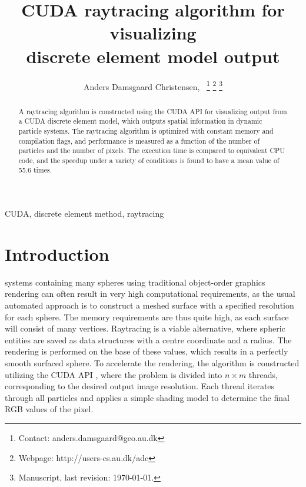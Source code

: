 \documentclass[journal]{IEEEtran}
\begin{document}
\title{CUDA raytracing algorithm for visualizing\\ discrete element model output}

\author{Anders Damsgaard Christensen,~
\thanks{Contact: {anders.damsgaard@geo.au.dk}}%
\thanks{Webpage: {http://users-cs.au.dk/adc}}%
\thanks{Manuscript, last revision: \today.}}


\maketitle


\begin{abstract}
A raytracing algorithm is constructed using the CUDA API for visualizing output from a CUDA discrete element model, which outputs spatial information in dynamic particle systems. 
The raytracing algorithm is optimized with constant memory and compilation flags, and performance is measured as a function of the number of particles and the number of pixels. The execution time is compared to equivalent CPU code, and the speedup under a variety of conditions is found to have a mean value of 55.6 times.
\end{abstract}
\begin{IEEEkeywords}
CUDA, discrete element method, raytracing
\end{IEEEkeywords}


\IEEEpeerreviewmaketitle


\section{Introduction}
 systems containing many spheres using traditional object-order graphics rendering can often result in very high computational requirements, as the usual automated approach is to construct a meshed surface with a specified resolution for each sphere. The memory requirements are thus quite high, as each surface will consist of many vertices. Raytracing \cite{Whitted:1980} is a viable alternative, where spheric entities are saved as data structures with a centre coordinate and a radius. The rendering is performed on the base of these values, which results in a perfectly smooth surfaced sphere. To accelerate the rendering, the algorithm is constructed utilizing the CUDA API \cite{Nvidia-1:2010}, where the problem is divided into $n\times m$ threads, corresponding to the desired output image resolution. Each thread iterates through all particles and applies a simple shading model to determine the final RGB values of the pixel.
\end{document}
